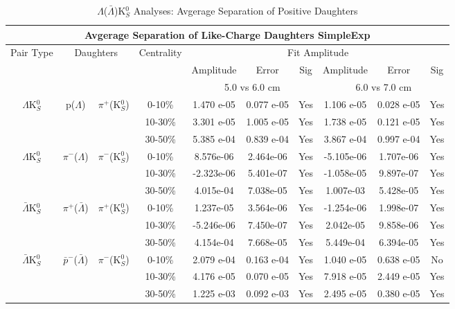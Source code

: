 \documentclass[../AnalysisNoteJBuxton.tex]{subfiles}
\begin{document}
\begin{table}
 \centering
 \begin{tabular}{|c|c|c|c|c|c|c||c|c|c|}
 \multicolumn{10}{c}{Avgerage Separation of Like-Charge Daughters SimpleExp} \\
  \hline
  \multirow{3}{*}{Pair Type} & \multicolumn{2}{c|}{\multirow{3}{*}{Daughters}} & \multirow{3}{*}{Centrality} & \multicolumn{6}{c|}{Fit Amplitude} \\
  \cline{5-10}
   & \multicolumn{2}{c|}{} & & Amplitude & Error & Sig & Amplitude & Error & Sig \\  
  \cline{5-10}
   & \multicolumn{2}{c|}{} & & \multicolumn{3}{c||}{5.0 vs 6.0 cm} & \multicolumn{3}{c|}{6.0 vs 7.0 cm} \\  
  \hline
  \multirow{3}{*}{$\Lambda$K$^{0}_{S}$} & \multirow{3}{*}{p($\Lambda$)} & \multirow{3}{*}{$\pi^{+}$(K$^{0}_{S}$)}
   &      0-10\% & 1.470 e-05 & 0.077 e-05 & Yes & 1.106 e-05 & 0.028 e-05 & Yes\\
   & & & 10-30\% & 3.301 e-05 & 1.005 e-05 & Yes & 1.738 e-05 & 0.121 e-05 & Yes \\
   & & & 30-50\% & 5.385 e-04 & 0.839 e-04 & Yes & 3.867 e-04 & 0.997 e-04 & Yes \\
  \hline
  \multirow{3}{*}{$\Lambda$K$^{0}_{S}$} & \multirow{3}{*}{$\pi^{-}$($\Lambda$)} & \multirow{3}{*}{$\pi^{-}$(K$^{0}_{S}$) }
   &      0-10\% & 8.576e-06 & 2.464e-06 & Yes & -5.105e-06 & 1.707e-06 & Yes \\
   & & & 10-30\% & -2.323e-06 & 5.401e-07 & Yes & -1.058e-05 & 9.897e-07 & Yes \\
   & & & 30-50\% & 4.015e-04 & 7.038e-05 & Yes & 1.007e-03 & 5.428e-05 & Yes \\
  \hline \hline
  \multirow{3}{*}{$\bar{\Lambda}$K$^{0}_{S}$} & \multirow{3}{*}{$\pi^{+}$($\bar{\Lambda}$)} & \multirow{3}{*}{$\pi^{+}$(K$^{0}_{S}$)} 
   &      0-10\% & 1.237e-05 & 3.564e-06 & Yes & -1.254e-06 & 1.998e-07 & Yes \\
   & & & 10-30\% & -5.246e-06 & 7.450e-07 & Yes & 2.042e-05 & 9.858e-06 & Yes \\
   & & & 30-50\% & 4.154e-04 & 7.668e-05 & Yes & 5.449e-04 & 6.394e-05 & Yes \\
  \hline
  \multirow{3}{*}{$\bar{\Lambda}$K$^{0}_{S}$} & \multirow{3}{*}{$\bar{p}^{-}$($\bar{\Lambda}$)} & \multirow{3}{*}{$\pi^{-}$(K$^{0}_{S}$)}
   &      0-10\% & 2.079 e-04 & 0.163 e-04 & Yes & 1.040 e-05 & 0.638 e-05 & No \\
   & & & 10-30\% & 4.176 e-05 & 0.070 e-05 & Yes & 7.918 e-05 & 2.449 e-05 & Yes \\
   & & & 30-50\% & 1.225 e-03 & 0.092 e-03 & Yes & 2.495 e-05 & 0.380 e-05 & Yes \\
  \hline
 \end{tabular}
 \caption{$\Lambda$($\bar{\Lambda}$)K$^{0}_{S}$ Analyses: Avgerage Separation of Positive Daughters}
 \label{tab:AvgSepLamK0_SimpleExp}
\end{table}
\end{document}
